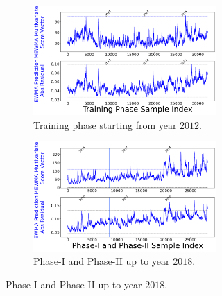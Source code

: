 \documentclass[twoside,11pt]{article}
\begin{document}
\begin{figure}[!htbp]
\centering
\begin{subfigure}[t]{0.48\linewidth}
     \centering
     \begin{subfigure}[t]{\linewidth}
     \centering
         \includegraphics[width=\textwidth, trim=.0in .0in .0in .0in, clip]{../figures/v14/bike_sharing/reg_lin_cat_syr_12_tr_5_new/train_bike_reg_1e-08_0_0001_0_01_99_99.png}
         \caption{Training phase starting from year $2012$.}
         \label{fig:bs_tr_2012}
     \end{subfigure}
     \begin{subfigure}[t]{\linewidth}
     \centering
         \includegraphics[width=\textwidth, trim=.0in .0in .0in .0in, clip]{../figures/v14/bike_sharing/reg_lin_cat_syr_12_tr_5_new/bike_reg_1e-08_0_0001_0_01_99_99.png}
         \caption{Phase-I and Phase-II up to year $2018$.}
         \label{fig:bs_PIPII_tr_2012}
     \end{subfigure}
\end{subfigure}
\begin{subfigure}[t]{0.48\linewidth}

\end{subfigure}
\end{figure}
\end{document}
